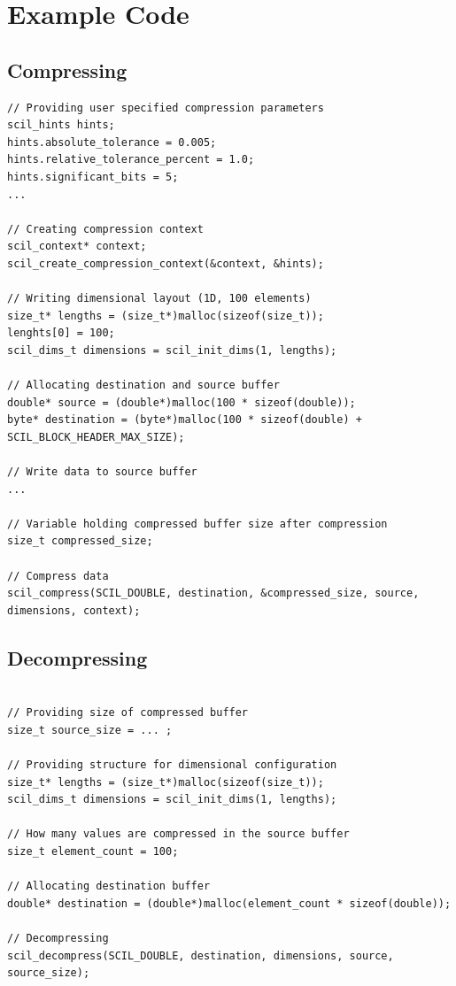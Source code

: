 \documentclass[
	12pt,
	a4paper,
	BCOR10mm,
	DIV14,
	headsepline,
]{scrreprt}
\begin{document}
\setcounter{footnote}{0}

\chapter{Example Code}


\section{Compressing}

\bigskip

\begin{lstlisting}[caption=Compression with SCIL, label={lst:comp}]
// Providing user specified compression parameters
scil_hints hints;
hints.absolute_tolerance = 0.005;
hints.relative_tolerance_percent = 1.0;
hints.significant_bits = 5;
...

// Creating compression context
scil_context* context;
scil_create_compression_context(&context, &hints);

// Writing dimensional layout (1D, 100 elements)
size_t* lengths = (size_t*)malloc(sizeof(size_t));
lenghts[0] = 100;
scil_dims_t dimensions = scil_init_dims(1, lengths);

// Allocating destination and source buffer
double* source = (double*)malloc(100 * sizeof(double));
byte* destination = (byte*)malloc(100 * sizeof(double) + SCIL_BLOCK_HEADER_MAX_SIZE);

// Write data to source buffer
...

// Variable holding compressed buffer size after compression
size_t compressed_size;

// Compress data
scil_compress(SCIL_DOUBLE, destination, &compressed_size, source, dimensions, context);
\end{lstlisting}

\clearpage

\section{Decompressing}

\bigskip

\begin{lstlisting}[caption=Decompression with SCIL, label={lst:decomp}]

// Providing size of compressed buffer
size_t source_size = ... ;

// Providing structure for dimensional configuration
size_t* lengths = (size_t*)malloc(sizeof(size_t));
scil_dims_t dimensions = scil_init_dims(1, lengths);

// How many values are compressed in the source buffer
size_t element_count = 100;

// Allocating destination buffer
double* destination = (double*)malloc(element_count * sizeof(double));

// Decompressing
scil_decompress(SCIL_DOUBLE, destination, dimensions, source, source_size);
\end{lstlisting}
\end{document}

